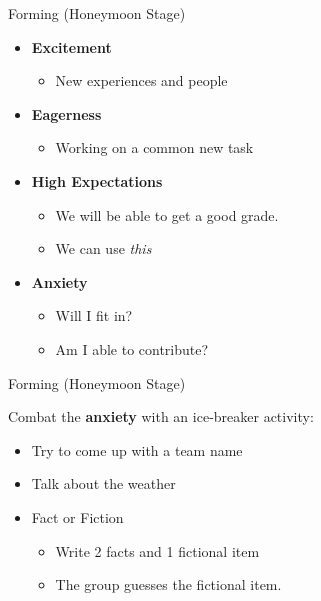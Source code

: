 \begin{frame}{Forming (Honeymoon Stage)}

\begin{itemize}
\tightlist
\item
  \textbf{Excitement}

  \begin{itemize}
  \tightlist
  \item
    New experiences and people
  \end{itemize}
\item
  \textbf{Eagerness}

  \begin{itemize}
  \tightlist
  \item
    Working on a common new task
  \end{itemize}
\item
  \textbf{High Expectations}

  \begin{itemize}
  \tightlist
  \item
    We will be able to get a good grade.
  \item
    We can use \emph{this}
  \end{itemize}
\item
  \textbf{Anxiety}

  \begin{itemize}
  \tightlist
  \item
    Will I fit in?
  \item
    Am I able to contribute?
  \end{itemize}
\end{itemize}

\end{frame}

\begin{frame}{Forming (Honeymoon Stage)}

Combat the \textbf{anxiety} with an ice-breaker activity:

\begin{itemize}
\tightlist
\item
  Try to come up with a team name
\item
  Talk about the weather
\item
  Fact or Fiction

  \begin{itemize}
  \tightlist
  \item
    Write 2 facts and 1 fictional item
  \item
    The group guesses the fictional item.
  \end{itemize}
\end{itemize}

\end{frame}

